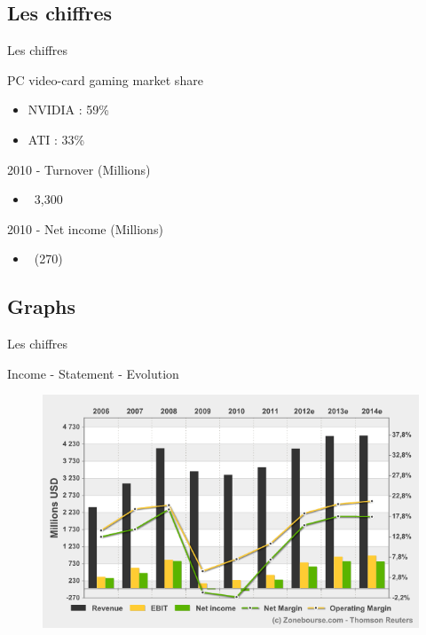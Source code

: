 \documentclass{beamer}
\begin{document}
\subsection{Les chiffres}
\begin{frame}{Les chiffres}
	\transdissolve[duration=0.1] %
	\begin{block}{PC video-card gaming market share}
		\begin{itemize}
			\item<+->{NVIDIA : 59\% }
			\item<+->{ATI : 33\% }
		\end{itemize}
	\end{block}	
	\begin{block}{2010 - Turnover (Millions)}
		\begin{itemize}
			\item<+->{~3,300}
		\end{itemize}
	\end{block}
	\begin{block}{2010 - Net income (Millions)}
		\begin{itemize}
			\item<+->{~(270)}
		\end{itemize}
	\end{block}
\end{frame}

\subsection{Graphs}
\begin{frame}{Les chiffres}
	\begin{block}{Income - Statement - Evolution}
		\begin{figure}[h]
			\includegraphics[width=1.15\textheight]{./Income_Statement_Evolution.png}
		\end{figure}
	\end{block}	
\end{frame}
\end{document}
